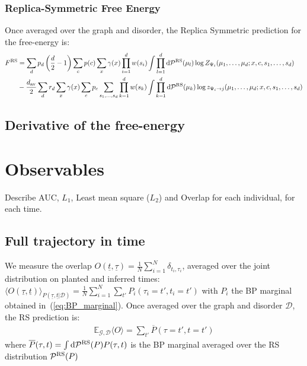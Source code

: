 \documentclass[a4paper, amsfonts, amssymb, amsmath, reprint, showkeys, nofootinbib, twoside, floatfix, pre,superscriptaddress, onecolumn]{revtex4-2}
\begin{document}
\subsubsection{Replica-Symmetric Free Energy}
Once averaged over the graph and disorder, the Replica Symmetric prediction for the free-energy is:
\begin{align}
\begin{aligned}
	F^{\rm RS} &= \sum_d p_d \left(\frac{d}{2}-1\right)\sum_cp(c)\sum_{x}\gamma(x)\prod_{i=1}^dw(s_i)\int\prod_{l=1}^d{\rm d}\mathcal{P}^{\rm RS}(\mu_l)\log Z_{\Psi_i}(\mu_1,\dots,\mu_d;x,c,s_1,\dots,s_d) \\
	&-\frac{d_{\rm av}}{2}\sum_dr_d\sum_{x}\gamma(x)\sum_cp_c\sum_{s_1,\dots,s_d}\prod_{k=1}^dw(s_k)\int\prod_{k=1}^d{\rm d}\mathcal{P}^{\rm RS}(\mu_k)\log z_{\Psi_i\to j}(\mu_1,\dots,\mu_d;x,c,s_1,\dots,s_d)
\end{aligned}
\end{align}

\subsection{Derivative of the free-energy}

\section{Observables}
Describe AUC, $L_1$, Least mean square ($L_2$) and Overlap for each individual, for each time.
\subsection{Full trajectory in time}
We measure the overlap $O(\underline{t},\underline{\tau}) = \frac{1}{N}\sum_{i=1}^N\delta_{t_i,\tau_i}$, averaged over the joint distribution on planted and inferred times:
$
	\langle O(\underline{\tau}, \underline{t})\rangle_{P(\underline{\tau}, \underline{t}|\mathcal{D})} = \frac{1}{N}\sum_{i=1}^N\sum_{t'}P_i(\tau_i=t',t_i=t')
$
with $P_i$ the BP marginal obtained in~(\ref{eq:BP_marginal}).
Once averaged over the graph and disorder $\mathcal{D}$, the RS prediction is:
\begin{align}
	\mathbb{E}_{\mathcal{G},\mathcal{D}}\langle O\rangle =\sum_{t'}\overline{P}(\tau=t',t=t')
\end{align}
where $\overline{P}(\tau, t) = \int {\rm d} \mathcal{P}^{\rm RS}(P)P(\tau, t)$ is the BP marginal averaged over the RS distribution $\mathcal{P}^{\rm RS}(P)$
\end{document}
